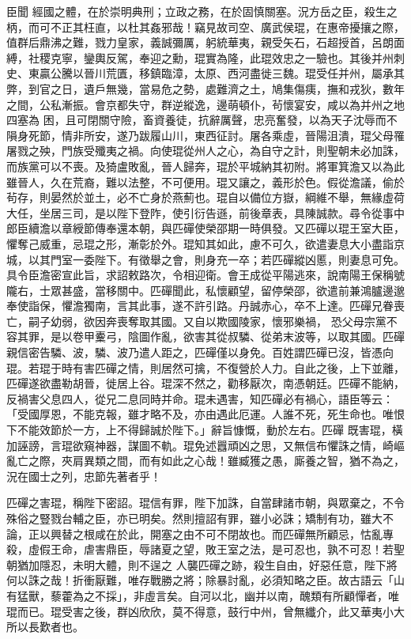 \begin{pinyinscope}
 臣聞
 經國之體，在於崇明典刑；立政之務，在於固慎關塞。況方岳之臣，殺生之柄，而可不正其枉直，以杜其姦邪哉！竊見故司空、廣武侯琨，在惠帝擾攘之際，值群后鼎沸之難，戮力皇家，義誠彌厲，躬統華夷，親受矢石，石超授首，呂朗面縛，社稷克寧，鑾輿反駕，奉迎之勳，琨實為隆，此琨效忠之一驗也。其後并州刺史、東贏公騰以晉川荒匱，移鎮臨漳，太原、西河盡徙三魏。琨受任并州，屬承其弊，到官之日，遺戶無幾，當易危之勢，處難濟之土，鳩集傷痍，撫和戎狄，數年之間，公私漸振。會京都失守，群逆縱逸，邊萌頓仆，茍懷宴安，咸以為并州之地四塞為
 困，且可閉關守險，畜資養徒，抗辭厲聲，忠亮奮發，以為天子沈辱而不隕身死節，情非所安，遂乃跋履山川，東西征討。屠各乘虛，晉陽沮潰，琨父母罹屠戮之殃，門族受殲夷之禍。向使琨從州人之心，為自守之計，則聖朝未必加誅，而族黨可以不喪。及猗盧敗亂，晉人歸奔，琨於平城納其初附。將軍箕澹又以為此雖晉人，久在荒裔，難以法整，不可便用。琨又讓之，義形於色。假從澹議，偷於茍存，則晏然於並土，必不亡身於燕薊也。琨自以備位方嶽，綱維不舉，無緣虛荷大任，坐居三司，是以陛下登阼，使引衍告遜，前後章表，具陳誠款。尋令從事中
 郎臣續澹以章綬節傳奉還本朝，與匹磾使榮邵期一時俱發。又匹磾以琨王室大臣，懼奪己威重，忌琨之形，漸彰於外。琨知其如此，慮不可久，欲遣妻息大小盡詣京城，以其門室一委陛下。有徵舉之會，則身充一卒；若匹磾縱凶慝，則妻息可免。具令臣澹密宣此旨，求詔敕路次，令相迎衛。會王成從平陽逃來，說南陽王保稱號隴右，士眾甚盛，當移關中。匹磾聞此，私懷顧望，留停榮邵，欲遣前兼鴻臚邊邈奉使詣保，懼澹獨南，言其此事，遂不許引路。丹誠赤心，卒不上達。匹磾兄眷喪亡，嗣子幼弱，欲因奔喪奪取其國。又自以欺國陵家，懷邪樂禍，
 恐父母宗黨不容其罪，是以卷甲櫜弓，陰圖作亂，欲害其從叔驎、從弟末波等，以取其國。匹磾親信密告驎、波，驎、波乃遣人距之，匹磾僅以身免。百姓謂匹磾已沒，皆憑向琨。若琨于時有害匹磾之情，則居然可擒，不復營於人力。自此之後，上下並離，匹磾遂欲盡勒胡晉，徙居上谷。琨深不然之，勸移厭次，南憑朝廷。匹磾不能納，反禍害父息四人，從兄二息同時并命。琨未遇害，知匹磾必有禍心，語臣等云：「受國厚恩，不能克報，雖才略不及，亦由遇此厄運。人誰不死，死生命也。唯恨下不能效節於一方，上不得歸誠於陛下。」辭旨慷慨，動於左右。匹磾
 既害琨，橫加誣謗，言琨欲窺神器，謀圖不軌。琨免述囂頑凶之思，又無信布懼誅之情，崎嶇亂亡之際，夾肩異類之間，而有如此之心哉！雖臧獲之愚，廝養之智，猶不為之，況在國士之列，忠節先著者乎！



 匹磾之害琨，稱陛下密詔。琨信有罪，陛下加誅，自當肆諸市朝，與眾棄之，不令殊俗之豎戮台輔之臣，亦已明矣。然則擅詔有罪，雖小必誅；矯制有功，雖大不論，正以興替之根咸在於此，開塞之由不可不閉故也。而匹磾無所顧忌，怙亂專殺，虛假王命，虐害鼎臣，辱諸夏之望，敗王室之法，是可忍也，孰不可忍！若聖朝猶加隱忍，未明大體，則不逞之
 人襲匹磾之跡，殺生自由，好惡任意，陛下將何以誅之哉！折衝厭難，唯存戰勝之將；除暴討亂，必須知略之臣。故古語云「山有猛獸，藜藿為之不採」，非虛言矣。自河以北，幽并以南，醜類有所顧憚者，唯琨而已。琨受害之後，群凶欣欣，莫不得意，鼓行中州，曾無纖介，此又華夷小大所以長歎者也。




\end{pinyinscope}
